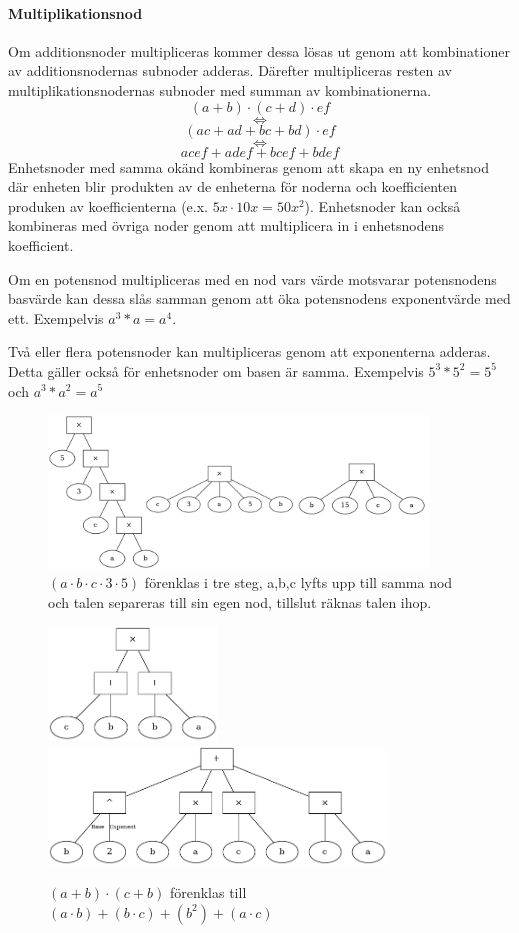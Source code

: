 \documentclass[12pt,a4paper]{article}
\begin{document}
\paragraph{Multiplikationsnod}
Om additionsnoder multipliceras kommer dessa lösas ut genom att kombinationer av additionsnodernas subnoder adderas. Därefter multipliceras resten av multiplikationsnodernas subnoder med summan av kombinationerna.
\[ \left( a+b \right) \cdot \left( c+d \right) \cdot ef \]
\[ \Leftrightarrow \]
\[ (ac + ad + bc + bd)\cdot ef \]
\[ \Leftrightarrow \]
\[ acef + adef + bcef + bdef \]
Enhetsnoder med samma okänd kombineras genom att skapa en ny enhetsnod där enheten blir produkten av de enheterna för noderna och koefficienten produken av koefficienterna (e.x. \(5x \cdot 10x = 50x^{2}\)). Enhetsnoder kan också kombineras med övriga noder genom att multiplicera in i enhetsnodens koefficient.\par
Om en potensnod multipliceras med en nod vars värde motsvarar potensnodens basvärde kan dessa slås samman genom att öka potensnodens exponentvärde med ett. Exempelvis \(a^{3} * a = a^{4}\).\par
Två eller flera potensnoder kan multipliceras genom att exponenterna adderas. Detta gäller också för enhetsnoder om basen är samma. Exempelvis \(5^{3} * 5^{2} = 5^{5}\) och \(a^{3} * a^{2} = a^{5}\)
\begin{figure}[H]
  \centering
  \includegraphics[width=0.9\textwidth]{image-merged}
  \caption{\((a \cdot b \cdot c \cdot 3 \cdot 5)\) förenklas i tre steg, a,b,c lyfts upp till samma nod och talen separeras till sin egen nod, tillslut räknas talen ihop.}
  \label{fig:2313}
\end{figure}
\begin{figure}[H]
  \centering
  \includegraphics[width=0.4\textwidth]{image26}
  \includegraphics[width=0.8\textwidth]{image32}
  \caption{\((a + b) \cdot (c + b)\) förenklas till \((a \cdot b) + (b \cdot c) + (b ^ 2) + (a \cdot c)\)}
\end{figure}
\end{document}

